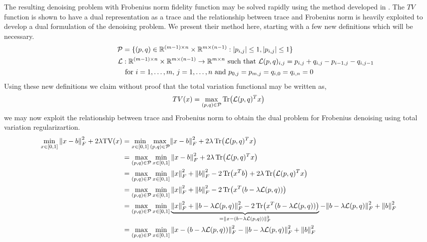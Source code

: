\documentclass[10pt,a4paper]{article}
\newcommand{\R}{\mathbb{R}}
\begin{document}
The resulting denoising problem with Frobenius norm fidelity function may be solved rapidly using the method developed in \cite{TV}.  The $TV$ function is shown to have a dual representation as a trace and the relationship between trace and Frobenius norm is heavily exploited to develop a dual formulation of the denoising problem.  We present their method here, starting with a few new definitions which will be necessary.
\begin{align*}
\mathcal{P} &= \{ (p,q) \in \R^{(m-1) \times n} \times \R^{ m \times (n-1) } :  \abs{p_{i,j} } \le 1, \abs{p_{ i,j } } \le 1 \} \\
 \mathcal{L} &: \R^{(m-1) \times n} \times \R^{ m \times (n-1) } \rightarrow \R^{m \times n}  \text{ such that } \mathcal{L}(p,q)_{i,j} = p_{i,j} + q_{i,j} - p_{ i-1,j } - q_{ i,j-1 }\\ \hspace{3 cm}& \text{ for } i = 1,\dots,m,\,j = 1,\dots,n \text{ and }  p_{0,j} = p_{m,j} = q_{i,0} = q_{i,n} = 0\\
\end{align*}
Using these new definitions we claim without proof that the total variation functional may be written as,
\begin{equation}
TV(x) = \underset{(p,q) \in \mathcal{P}}{\max} \Tr(\mathcal{L}(p,q)^Tx)
\end{equation}
we may now exploit the relationship between trace and Frobenius norm to obtain the dual problem for Frobenius denoising using total variation regularizartion.  
\begin{align*}
\min_{x \in [0,1]} \norm{x-b}_F^2 +2 \lambda \mathrm{TV}(x) &= \min_{x \in [0,1]}  \underset{(p,q) \in \mathcal{P}}{\max}  \norm{x-b}_F^2 + 2\lambda \Tr(\mathcal{L}(p,q)^Tx) \\
&= \underset{(p,q) \in \mathcal{P}}{\max}   \min_{x \in [0,1]} \norm{x-b}_F^2 +2 \lambda \Tr(\mathcal{L}(p,q)^Tx) \\
&=\underset{(p,q) \in \mathcal{P}}{\max}   \min_{x \in [0,1]} \norm{x}_F^2 + \norm{b}_F^2 - 2 \Tr(x^Tb)+ 2\lambda \Tr(\mathcal{L}(p,q)^Tx) \\
&=\underset{(p,q) \in \mathcal{P}}{\max}   \min_{x \in [0,1]} \norm{x}_F^2 + \norm{b}_F^2 - 2 \Tr(x^T(b- \lambda\mathcal{L}(p,q)))\\
&=\underset{(p,q) \in \mathcal{P}}{\max}   \min_{x \in [0,1]} \underbrace{\norm{x}_F^2 + \norm{b- \lambda\mathcal{L}(p,q)}_F^2 - 2 \Tr(x^T(b- \lambda\mathcal{L}(p,q)))}_{ = \norm{x-(b- \lambda\mathcal{L}(p,q))}_F^2} -  \norm{b- \lambda\mathcal{L}(p,q)}_F^2+ \norm{b}_F^2\\
&= \underset{(p,q) \in \mathcal{P}}{\max}   \min_{x \in [0,1]}  \norm{x-(b- \lambda\mathcal{L}(p,q))}_F^2 - \norm{b- \lambda\mathcal{L}(p,q)}_F^2+ \norm{b}_F^2
\end{align*}
\end{document}
